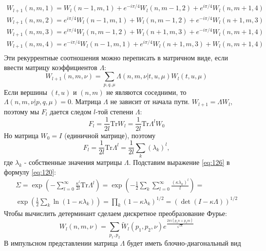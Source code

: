 \documentclass[a4paper,12pt]{article} \usepackage[utf8x]{inputenc} \usepackage[russian]{babel}
\theoremstyle{definition} \newtheorem{corollary}{Corollary}[theorem] \theoremstyle{definition}
\begin{document}
\begin{equation}
  \label{eq:122}
\begin{array}{l} W_{l+1}(n,m,1)=W_l(n-1,m,1)+e^{-i\pi/4} W_l(n,m-1,2)+e^{i\pi/4}W_l(n,m+1,4)\\
W_{l+1}(n,m,2)=e^{i\pi/4}W_l(n-1,m,1)+W_l(n,m-1,2)+e^{-i\pi/4}W_l(n+1,m,3)\\
W_{l+1}(n,m,3)=e^{i\pi/4}W_l(n,m-1,2)+W_l(n+1,m,3)+e^{-i\pi/4}W_l(n,m+1,4)\\
W_{l+1}(n,m,4)=e^{-i\pi/4}W_l(n-1,m,1)+e^{i\pi/4}W_l(n+1,m,3)+W_l(n,m+1,4)\\
\end{array}
\end{equation} Эти рекуррентные соотношения можно переписать в матричном виде, если ввести матрицу
коэффициентов $\Lambda$:
\begin{equation}
  \label{eq:124} W_{l+1}(n,m,\nu)=\sum_{p,q,\mu}\Lambda(n,m,\nu|t,u,\mu) W_l(t,u,\mu)
\end{equation} Если вершины $(t,u)$ и $(n,m)$ не являются соседними, то
$\Lambda(n,m,\nu|p,q,\mu)=0$. Матрица $\Lambda$ не зависит от начала пути. $W_{l+1}=\Lambda W_l$,
поэтому мы $F_l$ дается следом $l$-той степени $\Lambda$:
\begin{equation}
  \label{eq:125} F_l=\frac{1}{2l}\mathrm{Tr} W_l=\frac{1}{2l}\mathrm{Tr} \Lambda^l W_0
\end{equation} Но матрица $W_0=I$ (единичной матрице), поэтому
\begin{equation}
  \label{eq:126} F_l=\frac{1}{2l}\mathrm{Tr} \Lambda^l =\frac{1}{2l} \sum_k (\lambda_k)^l,
\end{equation} где $\lambda_k$ - собственные значения матрицы $\Lambda$. Подставим выражение
\eqref{eq:126} в формулу \eqref{eq:120}:
\begin{multline}
  \label{eq:127} \Sigma=\exp\left(-\sum_{l=0}^{\infty}
\frac{\kappa^l}{2l}\mathrm{Tr}\Lambda^l\right)=\exp\left(-\frac{1}{2}\sum_k \sum_{l=0}^{\infty}
\frac{(\kappa\lambda_k)^l}{l}\right)=\\ \exp\left(\frac{1}{2}\sum_k
\ln(1-\kappa\lambda_k)\right)=\prod_k(1-\kappa\lambda_k)^{1/2}=(\det(I-\kappa\Lambda))^{1/2}
\end{multline} Чтобы вычислить детерминант сделаем дискретное преобразование Фурье:
\begin{equation}
  \label{eq:128} W_{l}(n,m,\nu)=\sum_{p_1,p_2} \tilde{W}_l(p_1,p_2,\nu) e^{\frac{2\pi i
(p_1n+p_2m)}{\sqrt N}}
\end{equation} В импульсном представлении матрица $\Lambda$ будет иметь блочно-диагональный вид
\end{document}
